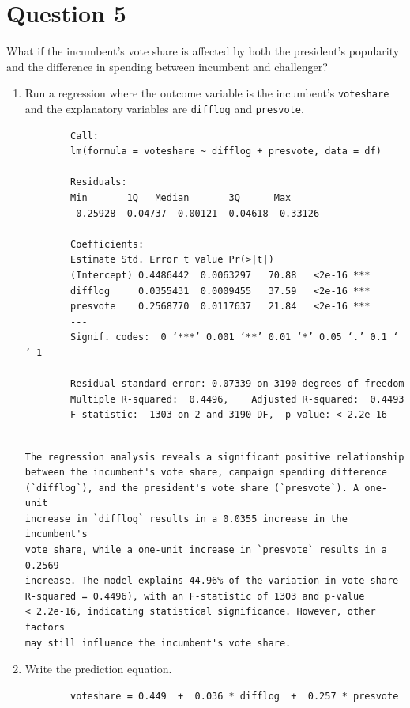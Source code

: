 \documentclass[12pt,letterpaper]{article}
\begin{document}
\section*{Question 5}
\noindent What if the incumbent's vote share is affected by both the president's popularity and the difference in spending between incumbent and challenger? 
	\begin{enumerate}
		\item Run a regression where the outcome variable is the incumbent's \texttt{voteshare} and the explanatory variables are \texttt{difflog} and \texttt{presvote}.	
		 
		\begin{verbatim}
		Call:
		lm(formula = voteshare ~ difflog + presvote, data = df)
		
		Residuals:
		Min       1Q   Median       3Q      Max 
		-0.25928 -0.04737 -0.00121  0.04618  0.33126 
		
		Coefficients:
		Estimate Std. Error t value Pr(>|t|)    
		(Intercept) 0.4486442  0.0063297   70.88   <2e-16 ***
		difflog     0.0355431  0.0009455   37.59   <2e-16 ***
		presvote    0.2568770  0.0117637   21.84   <2e-16 ***
		---
		Signif. codes:  0 ‘***’ 0.001 ‘**’ 0.01 ‘*’ 0.05 ‘.’ 0.1 ‘ ’ 1
		
		Residual standard error: 0.07339 on 3190 degrees of freedom
		Multiple R-squared:  0.4496,	Adjusted R-squared:  0.4493 
		F-statistic:  1303 on 2 and 3190 DF,  p-value: < 2.2e-16
	\end{verbatim}	
	\begin{verbatim}
		
The regression analysis reveals a significant positive relationship 
between the incumbent's vote share, campaign spending difference
(`difflog`), and the president's vote share (`presvote`). A one-unit
increase in `difflog` results in a 0.0355 increase in the incumbent's 
vote share, while a one-unit increase in `presvote` results in a 0.2569  
increase. The model explains 44.96% of the variation in vote share
R-squared = 0.4496), with an F-statistic of 1303 and p-value 
< 2.2e-16, indicating statistical significance. However, other factors 
may still influence the incumbent's vote share.
	\end{verbatim}	
		
		\item Write the prediction equation.
		 
		\begin{verbatim}
		voteshare = 0.449  +  0.036 * difflog  +  0.257 * presvote
		 \end{verbatim}	
		 

\end{enumerate}
\end{document}
